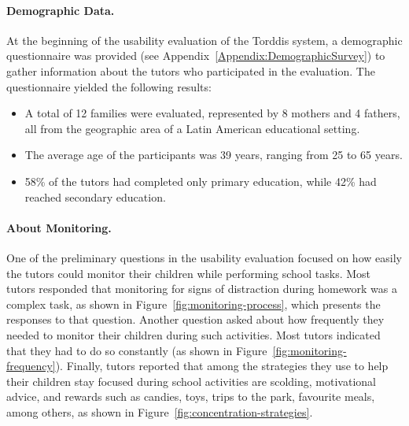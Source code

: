                 \paragraph{Demographic Data.}
                At the beginning of the usability evaluation of the Torddis system, a demographic questionnaire was provided (see Appendix~\ref{Appendix:DemographicSurvey}) to gather information about the tutors who participated in the evaluation. The questionnaire yielded the following results:
                
                \begin{itemize} 
                    \item A total of 12 families were evaluated, represented by 8 mothers and 4 fathers, all from the geographic area of a Latin American educational setting.
                    \item The average age of the participants was 39 years, ranging from 25 to 65 years.
                    \item 58\% of the tutors had completed only primary education, while 42\% had reached secondary education.
                \end{itemize}
                
                \paragraph{About Monitoring.}
                One of the preliminary questions in the usability evaluation focused on how easily the tutors could monitor their children while performing school tasks. Most tutors responded that monitoring for signs of distraction during homework was a complex task, as shown in Figure~\ref{fig:monitoring-process}, which presents the responses to that question. Another question asked about how frequently they needed to monitor their children during such activities. Most tutors indicated that they had to do so constantly (as shown in Figure~\ref{fig:monitoring-frequency}). Finally, tutors reported that among the strategies they use to help their children stay focused during school activities are scolding, motivational advice, and rewards such as candies, toys, trips to the park, favourite meals, among others, as shown in Figure~\ref{fig:concentration-strategies}.
                
